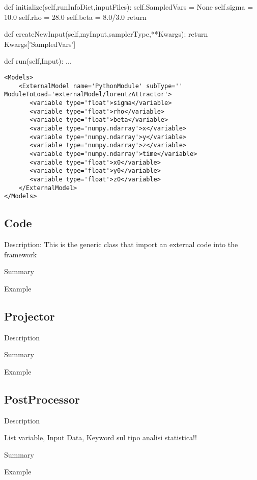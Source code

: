 \begin{python}
def initialize(self,runInfoDict,inputFiles):
  self.SampledVars = None
  self.sigma = 10.0
  self.rho   = 28.0
  self.beta  = 8.0/3.0
  return

def createNewInput(self,myInput,samplerType,**Kwargs):
  return Kwargs['SampledVars']

def run(self,Input):
   ...
\end{python}


\begin{lstlisting}[style=XML]
<Models>
    <ExternalModel name='PythonModule' subType='' ModuleToLoad='externalModel/lorentzAttractor'>  
       <variable type='float'>sigma</variable>
       <variable type='float'>rho</variable>
       <variable type='float'>beta</variable>
       <variable type='numpy.ndarray'>x</variable>
       <variable type='numpy.ndarray'>y</variable>
       <variable type='numpy.ndarray'>z</variable>
       <variable type='numpy.ndarray'>time</variable>
       <variable type='float'>x0</variable>
       <variable type='float'>y0</variable>
       <variable type='float'>z0</variable>
    </ExternalModel>
</Models> 
\end{lstlisting}

\subsection{Code}
\label{sec:models_code}

Description: This is the generic class that import an external code into the framework

Summary

Example

\subsection{Projector}
\label{sec:models_projector}

Description

Summary

Example

\subsection{PostProcessor}
\label{sec:models_postProcessor}

Description

List variable, Input Data, 
Keyword sul tipo analisi statistica!!

Summary

Example
